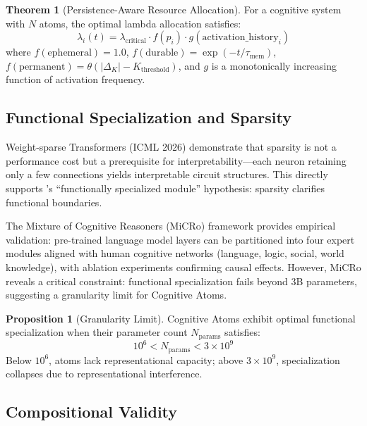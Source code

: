\documentclass[11pt,a4paper]{article}
\theoremstyle{definition}
\newtheorem{theorem}{Theorem}[section]
\newtheorem{proposition}{Proposition}[section]
\theoremstyle{remark}
\newcommand{\CAA}{\text{CAA-X}}
\begin{document}
\begin{theorem}[Persistence-Aware Resource Allocation]\label{thm:persistence-allocation}
For a cognitive system with $N$ atoms, the optimal lambda allocation satisfies:
\begin{equation}
\lambda_i(t) = \lambda_{\text{critical}} \cdot f(p_i) \cdot g(\text{activation\_history}_i)
\end{equation}
where $f(\text{ephemeral}) = 1.0$, $f(\text{durable}) = \exp(-t/\tau_{\text{mem}})$, $f(\text{permanent}) = \theta(|\Delta_K| - K_{\text{threshold}})$, and $g$ is a monotonically increasing function of activation frequency.
\end{theorem}

\subsection{Functional Specialization and Sparsity}\label{subsec:sparsity}

Weight-sparse Transformers (ICML 2026) demonstrate that sparsity is not a performance cost but a prerequisite for interpretability---each neuron retaining only a few connections yields interpretable circuit structures. This directly supports \CAA{}'s ``functionally specialized module'' hypothesis: sparsity clarifies functional boundaries.

The Mixture of Cognitive Reasoners (MiCRo) framework provides empirical validation: pre-trained language model layers can be partitioned into four expert modules aligned with human cognitive networks (language, logic, social, world knowledge), with ablation experiments confirming causal effects. However, MiCRo reveals a critical constraint: functional specialization fails beyond 3B parameters, suggesting a granularity limit for Cognitive Atoms.

\begin{proposition}[Granularity Limit]\label{prop:granularity}
Cognitive Atoms exhibit optimal functional specialization when their parameter count $N_{\text{params}}$ satisfies:
\begin{equation}
10^6 < N_{\text{params}} < 3 \times 10^9
\end{equation}
Below $10^6$, atoms lack representational capacity; above $3 \times 10^9$, specialization collapses due to representational interference.
\end{proposition}

\subsection{Compositional Validity}\label{subsec:compositional-validity}
\end{document}

